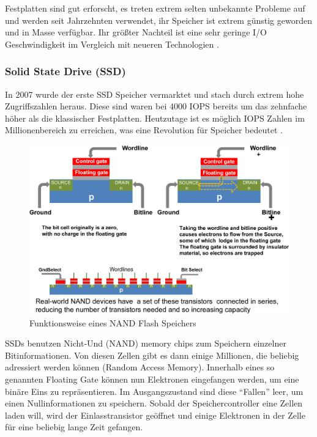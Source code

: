 Festplatten sind gut erforscht, es treten extrem selten unbekannte Probleme auf und werden seit Jahrzehnten verwendet, ihr Speicher ist extrem günstig geworden und in Masse verfügbar. Ihr größter Nachteil ist eine sehr geringe I/O Geschwindigkeit im Vergleich mit neueren Technologien \parencite[Kap. 3]{kaufmann.2016}.

\subsubsection{Solid State Drive (SSD)}

In 2007 wurde der erste SSD Speicher vermarktet und stach durch extrem hohe Zugriffszahlen heraus. Diese sind waren bei 4000 \gls{IOPS} bereits um das zehnfache höher als die klassischer Festplatten. Heutzutage ist es möglich IOPS Zahlen im Millionenbereich zu erreichen, was eine Revolution für Speicher bedeutet \parencite[Kap. 3]{kaufmann.2016}.

\begin{figure}[hbt]
	\centering
	\includegraphics[scale=0.85]{images/flash}
	\caption{Funktionsweise eines NAND Flash Speichers \parencite{kaufmann.2016}}
	\label{fig:flash}
\end{figure}

SSDs benutzen Nicht-Und (NAND) memory chips zum Speichern einzelner Bitinformationen. Von diesen Zellen gibt es dann einige Millionen, die beliebig adressiert werden können (Random Access Memory). Innerhalb eines so genannten Floating Gate können nun Elektronen eingefangen werden, um eine binäre Eins zu repräsentieren. Im Ausgangszustand sind diese ``Fallen'' leer, um einen Nullinformationen zu speichern. Sobald der Speichercontroller eine Zellen laden will, wird der Einlasstransistor geöffnet und einige Elektronen in der Zelle für eine beliebig lange Zeit gefangen.

